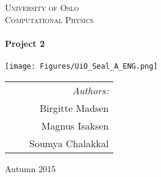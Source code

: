 \thispagestyle{empty}

\begin{center}



\textsc{\LARGE University of Oslo}\\[0.5cm]

\textsc{\Large Computational Physics}\\[2cm]
 

\HRule \\[0.4cm]
 \LARGE \textbf{Project 2}  \\[0.2cm]
\HRule \\[2.5cm]

\vspace{2cm}
\texttt{[image: Figures/UiO\_Seal\_A\_ENG.png]}\\  %

\vfill 
 
\begin{tabularx}{\textwidth}{l X r}
\hline
& & \large \emph{Authors:}\\
& & \large Birgitte Madsen\\
& & \large Magnus Isaksen \\
& & \large Soumya Chalakkal \\
\hline

\end{tabularx}




\vfill

{\large Autumn 2015}

\end{center}
\cleardoublepage

